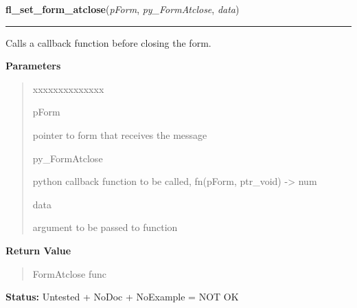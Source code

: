 \hspace{.8\funcindent}\begin{boxedminipage}{\funcwidth}

    \raggedright \textbf{fl\_set\_form\_atclose}(\textit{pForm}, \textit{py\_FormAtclose}, \textit{data})

    \vspace{-1.5ex}

    \rule{\textwidth}{0.5\fboxrule}
\setlength{\parskip}{2ex}
    Calls a callback function before closing the form.

\setlength{\parskip}{1ex}
      \textbf{Parameters}
      \vspace{-1ex}

      \begin{quote}
        \begin{Ventry}{xxxxxxxxxxxxxx}

          \item[pForm]

          pointer to form that receives the message

          \item[py\_FormAtclose]

          python callback function to be called, fn(pForm, ptr\_void) 
          -{\textgreater} num

          \item[data]

          argument to be passed to function

        \end{Ventry}

      \end{quote}

      \textbf{Return Value}
    \vspace{-1ex}

      \begin{quote}
      FormAtclose func

      \end{quote}

\textbf{Status:} Untested + NoDoc + NoExample = NOT OK



    \end{boxedminipage}

    \label{xformslib:library:fl_set_atclose}

    \vspace{0.5ex}

